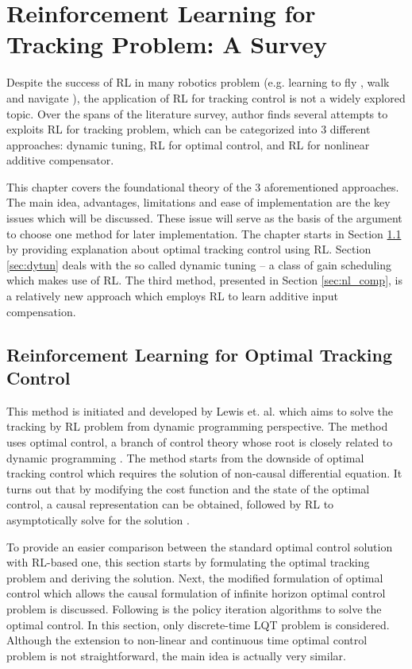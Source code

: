 %
\chapter{Reinforcement Learning for Tracking Problem: A Survey} \label{chap::survey}
Despite the success of \ac{RL} in many robotics problem (e.g. learning to fly \cite{Abbeel}, walk \cite{NIPS2007_3253} and navigate \cite{4543641}), the application of \ac{RL} for tracking control is not a widely explored topic. Over the spans of the literature survey, author finds several attempts to exploits \ac{RL} for tracking problem, which can be categorized into 3 different approaches: dynamic tuning, \ac{RL} for optimal control, and \ac{RL} for nonlinear additive compensator. 

This chapter covers the foundational theory of the 3 aforementioned approaches. The main idea, advantages, limitations and ease of implementation are the key issues which will be discussed. These issue will serve as the basis of the argument to choose one method for later implementation. The chapter starts in Section \ref{sec:rl_lqt} by providing explanation about optimal tracking control using \ac{RL}. Section \ref{sec:dytun} deals with the so called dynamic tuning -- a class of gain scheduling which makes use of \ac{RL}. The third method, presented in Section \ref{sec:nl_comp}, is a relatively new approach which employs \ac{RL} to learn additive input compensation.

\section{Reinforcement Learning for Optimal Tracking Control} \label{sec:rl_lqt}
This method is initiated and developed by Lewis et. al. which aims to solve the tracking by \ac{RL} problem from dynamic programming perspective. The method uses optimal control, a branch of control theory whose root is closely related to dynamic programming \cite{126844}. The method starts from the downside of optimal tracking control which requires the solution of non-causal differential equation. It turns out that by modifying the cost function and the state of the optimal control, a causal representation can be obtained, followed by \ac{RL} to asymptotically solve for the solution . 

To provide an easier comparison between the standard optimal control solution with \ac{RL}-based one, this section starts by formulating the optimal tracking problem and deriving the solution. Next, the modified formulation of optimal control which allows the causal formulation of infinite horizon optimal control problem is discussed. Following is the policy iteration algorithms to solve the optimal control. In this section, only discrete-time \ac{LQT} problem is considered. Although the extension to non-linear and continuous time optimal control problem is not straightforward, the main idea is actually very similar.

